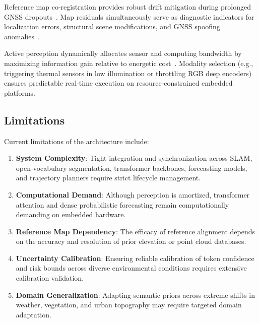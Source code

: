 Reference map co-registration provides robust drift mitigation during prolonged GNSS dropouts~\cite{liu2022largescale, yue2025airground, radwan2024uav}. Map residuals simultaneously serve as diagnostic indicators for localization errors, structural scene modifications, and GNSS spoofing anomalies~\cite{pomianek2026s4dtam}.

Active perception dynamically allocates sensor and computing bandwidth by maximizing information gain relative to energetic cost~\cite{pomianek2026s4dtam, tao2024active, tian2024same}. Modality selection (e.g., triggering thermal sensors in low illumination or throttling RGB deep encoders) ensures predictable real-time execution on resource-constrained embedded platforms.

\subsection{Limitations}
\label{subsec:limitations}

Current limitations of the architecture include:
\begin{enumerate}
  \item \textbf{System Complexity}: Tight integration and synchronization across SLAM, open-vocabulary segmentation, transformer backbones, forecasting models, and trajectory planners require strict lifecycle management.
  \item \textbf{Computational Demand}: Although perception is amortized, transformer attention and dense probabilistic forecasting remain computationally demanding on embedded hardware.
  \item \textbf{Reference Map Dependency}: The efficacy of reference alignment depends on the accuracy and resolution of prior elevation or point cloud databases.
  \item \textbf{Uncertainty Calibration}: Ensuring reliable calibration of token confidence and risk bounds across diverse environmental conditions requires extensive calibration validation.
  \item \textbf{Domain Generalization}: Adapting semantic priors across extreme shifts in weather, vegetation, and urban topography may require targeted domain adaptation.
\end{enumerate}
